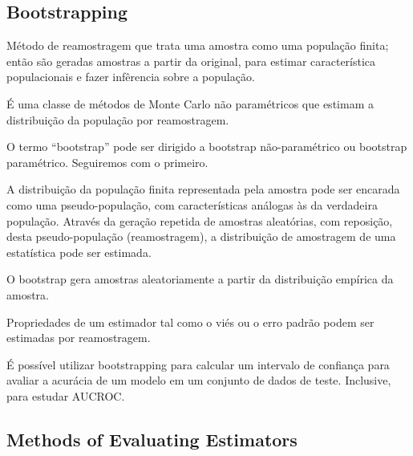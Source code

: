 \subsection{Bootstrapping}
Método de reamostragem que trata uma amostra como uma população finita; então são geradas amostras a partir da original, para estimar característica populacionais e fazer infêrencia sobre a população.

É uma classe de métodos de Monte Carlo não paramétricos que estimam a distribuição da população por reamostragem.

O termo “bootstrap” pode ser dirigido a bootstrap não-paramétrico ou bootstrap
paramétrico. Seguiremos com o primeiro.

A distribuição da população finita representada pela amostra pode ser encarada como uma pseudo-população, com características análogas às da verdadeira população. Através da geração repetida de amostras aleatórias, com reposição, desta pseudo-população (reamostragem), a distribuição de amostragem de uma estatística pode ser estimada. 

O bootstrap gera amostras aleatoriamente a partir da distribuição empírica da amostra.

Propriedades de um estimador tal como o viés ou o erro padrão podem ser estimadas
por reamostragem.


É possível utilizar bootstrapping para calcular um intervalo de confiança para avaliar a acurácia de um modelo em um conjunto de dados de teste. Inclusive, para estudar AUCROC.

\subsection{Methods of Evaluating Estimators}

